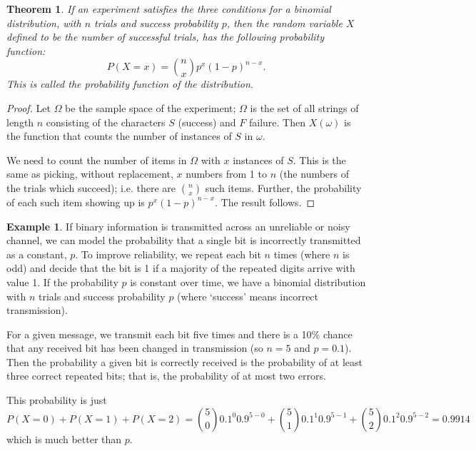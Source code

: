 \documentclass[a4paper,leqno]{article}
\numberwithin{equation}{section}
\newtheorem{thm}[equation]{Theorem}
\theoremstyle{definition}
\newtheorem{ex}[equation]{Example}
\theoremstyle{remark}
\begin{document}
\begin{thm}
  If an experiment satisfies the three conditions for a binomial distribution, with $ n $ trials and success probability $ p $,
  then the random variable $ X $ defined to be the number of successful trials, has the following probability function:
  \begin{displaymath}
    P(X = x) = \binom{n}{x} p^x (1-p)^{n-x}.
  \end{displaymath}
  This is called the probability function of the distribution.
\end{thm}
\begin{proof}
  Let $ \Omega $ be the sample space of the experiment; $ \Omega $ is the set of all strings of length $ n $ consisting
  of the characters $ S $ (success) and $ F $ failure. Then $ X(\omega) $ is the function that counts the number of instances
  of $ S $ in $ \omega $.

  We need to count the number of items in $ \Omega $ with $ x $ instances of $ S $. This is the same as picking, without
  replacement, $ x $ numbers from 1 to $ n $ (the numbers of the trials which succeed); i.e. there are $ \binom{n}{x} $
  such items. Further, the probability of each such item showing up is $ p^x (1 - p)^{n - x} $. The result follows.
\end{proof}

\begin{ex}
  If binary information is transmitted across an unreliable or noisy channel, we can model the probability
  that a single bit is incorrectly transmitted as a constant, $ p $. To improve reliability, we repeat each
  bit $ n $ times (where $ n $ is odd) and decide that the bit is 1 if a majority of the repeated digits arrive
  with value 1. If the probability $ p $ is constant over time, we have a binomial distribution with $ n $ trials
  and success probability $ p $ (where `success' means incorrect transmission).

  For a given message, we transmit each bit five times and there is a 10\% chance that any received bit has been
  changed in transmission (so $ n = 5 $ and $ p = 0.1 $). Then the probability a given bit is correctly received
  is the probability of at least three correct repeated bits; that is, the probability of at most two errors.

  This probability is just
  \begin{displaymath}
    P(X = 0) + P(X = 1) + P(X = 2) = \binom{5}{0} 0.1^0 0.9^{5-0} + \binom{5}{1} 0.1^1 0.9^{5-1} + \binom{5}{2} 0.1^2 0.9^{5-2} = 0.9914
  \end{displaymath}
  which is much better than $ p $.
\end{ex}
\end{document}
